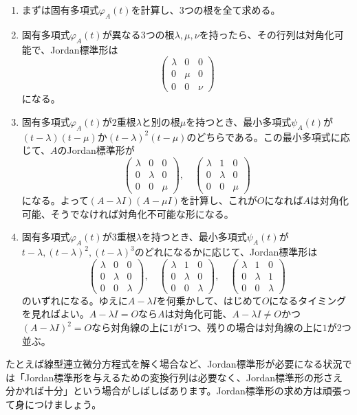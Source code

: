 \begin{enumerate}
\item まずは固有多項式$\varphi_A(t)$を計算し、$3$つの根を全て求める。
\item 固有多項式$\varphi_A(t)$が異なる$3$つの根$\lambda, \mu, \nu$を持ったら、その行列は対角化可能で、Jordan標準形は
\[
\begin{pmatrix}
\lambda & 0 & 0 \\
0 & \mu & 0 \\
0 & 0 & \nu
\end{pmatrix}
\]
になる。
\item 固有多項式$\varphi_A(t)$が$2$重根$\lambda$と別の根$\mu$を持つとき、最小多項式$\psi_A(t)$が$(t - \lambda)(t - \mu)$か$(t - \lambda)^2 (t - \mu)$のどちらである。この最小多項式に応じて、$A$のJordan標準形が
\[
\begin{pmatrix}
\lambda & 0 & 0 \\
0 & \lambda & 0 \\
0 & 0 & \mu
\end{pmatrix}, \quad
\begin{pmatrix}
\lambda & 1 & 0 \\
0 & \lambda & 0 \\
0 & 0 & \mu
\end{pmatrix}
\]
になる。よって$(A - \lambda I) (A - \mu I)$を計算し、これが$O$になれば$A$は対角化可能、そうでなければ対角化不可能な形になる。
\item 固有多項式$\varphi_A(t)$が$3$重根$\lambda$を持つとき、最小多項式$\psi_A(t)$が$t - \lambda, (t - \lambda)^2, (t - \lambda)^3$のどれになるかに応じて、Jordan標準形は
\[
\begin{pmatrix}
\lambda & 0 & 0 \\
0 & \lambda & 0 \\
0 & 0 & \lambda
\end{pmatrix}, \quad
\begin{pmatrix}
\lambda & 1 & 0 \\
0 & \lambda & 0 \\
0 & 0 & \lambda
\end{pmatrix}, \quad
\begin{pmatrix}
\lambda & 1 & 0 \\
0 & \lambda & 1 \\
0 & 0 & \lambda
\end{pmatrix}
\]
のいずれになる。ゆえに$A - \lambda I$を何乗かして、はじめて$O$になるタイミングを見ればよい。$A - \lambda I = O$なら$A$は対角化可能、$A - \lambda I \neq O$かつ$(A - \lambda I)^2 = O$なら対角線の上に$1$が$1$つ、残りの場合は対角線の上に$1$が$2$つ並ぶ。
\end{enumerate}

たとえば線型連立微分方程式を解く場合など、Jordan標準形が必要になる状況では「Jordan標準形を与えるための変換行列は必要なく、Jordan標準形の形さえ分かれば十分」という場合がしばしばあります。Jordan標準形の求め方は頑張って身につけましょう。

